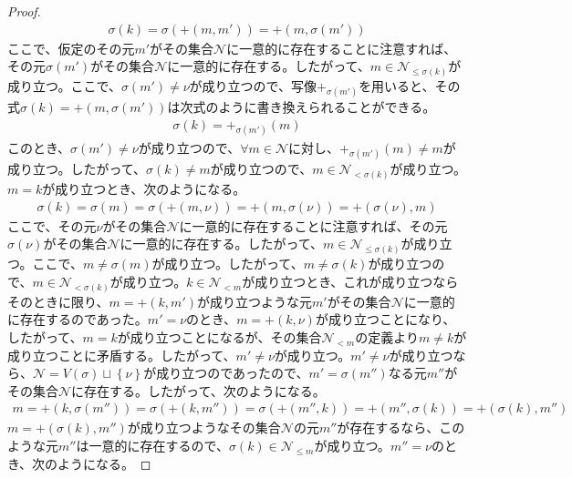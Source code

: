 \documentclass[dvipdfmx]{jsarticle}
\begin{document}
\begin{proof}
\begin{align*}
\sigma(k) = \sigma\left( + \left( m,m' \right) \right) = + \left( m,\sigma\left( m' \right) \right)
\end{align*}
ここで、仮定のその元$m'$がその集合$\mathcal{N}$に一意的に存在することに注意すれば、その元$\sigma\left( m' \right)$がその集合$\mathcal{N}$に一意的に存在する。したがって、$m \in \mathcal{N}_{\leq \sigma(k)}$が成り立つ。ここで、$\sigma\left( m' \right) \neq \nu$が成り立つので、写像$+_{\sigma\left( m' \right)}$を用いると、その式$\sigma(k) = + \left( m,\sigma\left( m' \right) \right)$は次式のように書き換えられることができる。
\begin{align*}
\sigma(k) = +_{\sigma\left( m' \right)}(m)
\end{align*}
このとき、$\sigma\left( m' \right) \neq \nu$が成り立つので、$\forall m \in \mathcal{N}$に対し、$+_{\sigma\left( m' \right)}(m) \neq m$が成り立つ。したがって、$\sigma(k) \neq m$が成り立つので、$m \in \mathcal{N}_{< \sigma(k)}$が成り立つ。$m = k$が成り立つとき、次のようになる。
\begin{align*}
\sigma(k) = \sigma(m) = \sigma\left( + (m,\nu) \right) = + \left( m,\sigma(\nu) \right) = + \left( \sigma(\nu),m \right)
\end{align*}
ここで、その元$\nu$がその集合$\mathcal{N}$に一意的に存在することに注意すれば、その元$\sigma(\nu)$がその集合$\mathcal{N}$に一意的に存在する。したがって、$m \in \mathcal{N}_{\leq \sigma(k)}$が成り立つ。ここで、$m \neq \sigma(m)$が成り立つ。したがって、$m \neq \sigma(k)$が成り立つので、$m \in \mathcal{N}_{< \sigma(k)}$が成り立つ。$k \in \mathcal{N}_{< m}$が成り立つとき、これが成り立つならそのときに限り、$m = + \left( k,m' \right)$が成り立つような元$m'$がその集合$\mathcal{N}$に一意的に存在するのであった。$m' = \nu$のとき、$m = + (k,\nu)$が成り立つことになり、したがって、$m = k$が成り立つことになるが、その集合$\mathcal{N}_{< m}$の定義より$m \neq k$が成り立つことに矛盾する。したがって、$m' \neq \nu$が成り立つ。$m' \neq \nu$が成り立つなら、$\mathcal{N} =V(\sigma) \sqcup \left\{ \nu \right\}$が成り立つのであったので、$m' = \sigma\left( m'' \right)$なる元$m''$がその集合$\mathcal{N}$に存在する。したがって、次のようになる。
\begin{align*}
m = + \left( k,\sigma\left( m'' \right) \right) = \sigma\left( + \left( k,m'' \right) \right) = \sigma\left( + \left( m'',k \right) \right) = + \left( m'',\sigma(k) \right) = + \left( \sigma(k),m'' \right)
\end{align*}
$m = + \left( \sigma(k),m'' \right)$が成り立つようなその集合$\mathcal{N}$の元$m''$が存在するなら、このような元$m''$は一意的に存在するので、$\sigma(k) \in \mathcal{N}_{\leq m}$が成り立つ。$m'' = \nu$のとき、次のようになる。

\end{proof}
\end{document}
